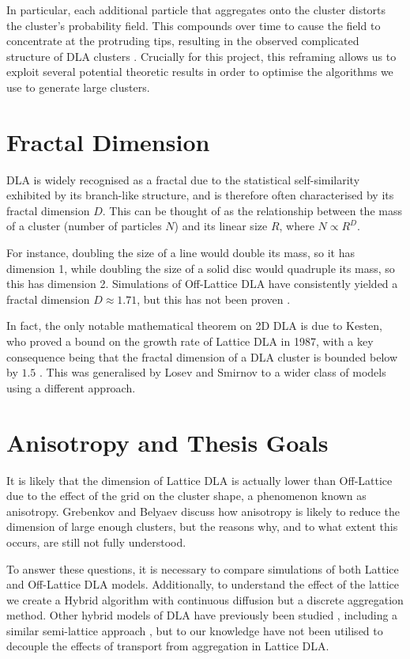 \documentclass[12pt, a4paper, oneside]{report}
\theoremstyle{remark}
\begin{document}
In particular, each additional particle that aggregates onto the cluster distorts the cluster's probability field. This compounds over time to cause the field to concentrate at the protruding tips, resulting in the observed complicated structure of DLA clusters \cite{Lawler2010}.
Crucially for this project, this reframing allows us to exploit several potential theoretic results in order to optimise the algorithms we use to generate large clusters.


\section{Fractal Dimension}
DLA is widely recognised as a fractal due to the statistical self-similarity exhibited by its branch-like structure, and is therefore often characterised by its fractal dimension $D$. This can be thought of as the relationship between the mass of a cluster (number of particles $N$) and its linear size $R$, where $N \propto R^D$.

For instance, doubling the size of a line would double its mass, so it has dimension 1, while doubling the size of a solid disc would quadruple its mass, so this has dimension 2. Simulations of Off-Lattice DLA have consistently yielded a fractal dimension $D \approx 1.71$, but this has not been proven \cite{Meakin1983}.

In fact, the only notable mathematical theorem on 2D DLA is due to Kesten, who proved a bound on the growth rate of Lattice DLA in 1987, with a key consequence being that the fractal dimension of a DLA cluster is bounded below by $1.5$ \cite{Kesten1987}. This was generalised by Losev and Smirnov \cite{losev2025} to a wider class of models using a different approach.

\section{Anisotropy and Thesis Goals}
It is likely that the dimension of Lattice DLA is actually lower than Off-Lattice due to the effect of the grid on the cluster shape, a phenomenon known as anisotropy. Grebenkov and Belyaev \cite{Grebenkov2017} discuss how anisotropy is likely to reduce the dimension of large enough clusters, but the reasons why, and to what extent this occurs, are still not fully understood.

To answer these questions, it is necessary to compare simulations of both Lattice and Off-Lattice DLA models. Additionally, to understand the effect of the lattice we create a Hybrid algorithm with continuous diffusion but a discrete aggregation method. Other hybrid models of DLA have previously been studied \cite{Sanz2019}, including a similar semi-lattice approach \cite{Menshutin2011}, but to our knowledge have not been utilised to decouple the effects of transport from aggregation in Lattice DLA.
\end{document}
